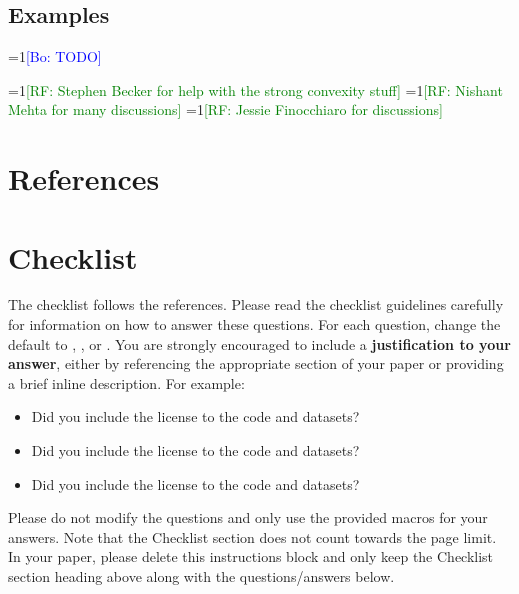 \documentclass{article}
\theoremstyle{definition}\newtheorem{definition}{Definition}
\theoremstyle{definition}\newtheorem{assumption}{Assumption}
\newcommand{\Comments}{1}
\newcommand{\mynote}[2]{\ifnum\Comments=1\textcolor{#1}{#2}\fi}
\newcommand{\raf}[1]{\mynote{green}{[RF: #1]}}
\newcommand{\bo}[1]{\mynote{blue}{[Bo: #1]}}
\begin{document}
\subsection{Examples}
\bo{TODO}




\begin{ack}
  \raf{Stephen Becker for help with the strong convexity stuff}
  \raf{Nishant Mehta for many discussions}
  \raf{Jessie Finocchiaro for discussions}
\end{ack}

\section*{References}




\section*{Checklist}

The checklist follows the references.  Please
read the checklist guidelines carefully for information on how to answer these
questions.  For each question, change the default \answerTODO{} to \answerYes{},
\answerNo{}, or \answerNA{}.  You are strongly encouraged to include a {\bf
justification to your answer}, either by referencing the appropriate section of
your paper or providing a brief inline description.  For example:
\begin{itemize}
  \item Did you include the license to the code and datasets? 
  \item Did you include the license to the code and datasets? 
  \item Did you include the license to the code and datasets? \answerNA{}
\end{itemize}
Please do not modify the questions and only use the provided macros for your
answers.  Note that the Checklist section does not count towards the page
limit.  In your paper, please delete this instructions block and only keep the
Checklist section heading above along with the questions/answers below.
\end{document}
